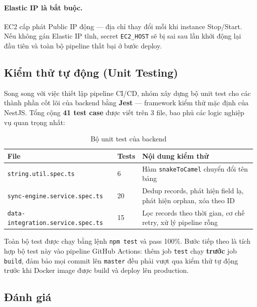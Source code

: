 \paragraph{Elastic IP là bắt buộc.}
EC2 cấp phát Public IP động --- địa chỉ thay đổi mỗi khi instance
Stop/Start. Nếu không gán Elastic IP tĩnh, secret \texttt{EC2\_HOST} sẽ
bị sai sau lần khởi động lại đầu tiên và toàn bộ pipeline thất bại ở bước
deploy.

\subsection{Kiểm thử tự động (Unit Testing)}

Song song với việc thiết lập pipeline CI/CD, nhóm xây dựng bộ unit test
cho các thành phần cốt lõi của backend bằng \textbf{Jest} --- framework
kiểm thử mặc định của NestJS. Tổng cộng \textbf{41 test case} được viết
trên 3 file, bao phủ các logic nghiệp vụ quan trọng nhất:

\begin{table}[H]
\centering
\caption{Bộ unit test của backend}
\label{tab:unit-tests}
\begin{tabular}{llp{7cm}}
\hline
\textbf{File} & \textbf{Tests} & \textbf{Nội dung kiểm thử} \\
\hline
\texttt{string.util.spec.ts}           & 6  & Hàm \texttt{snakeToCamel} chuyển đổi tên bảng \\
\texttt{sync-engine.service.spec.ts}   & 20 & Dedup records, phát hiện field lạ, phát hiện orphan, xóa theo ID \\
\texttt{data-integration.service.spec.ts} & 15 & Lọc records theo thời gian, cơ chế retry, xử lý pipeline rỗng \\
\hline
\end{tabular}
\end{table}

Toàn bộ test được chạy bằng lệnh \texttt{npm test} và pass 100\%.
Bước tiếp theo là tích hợp bộ test này vào pipeline GitHub Actions:
thêm job \texttt{test} chạy \textbf{trước} job \texttt{build}, đảm bảo
mọi commit lên \texttt{master} đều phải vượt qua kiểm thử tự động trước
khi Docker image được build và deploy lên production.

\subsection{Đánh giá}

